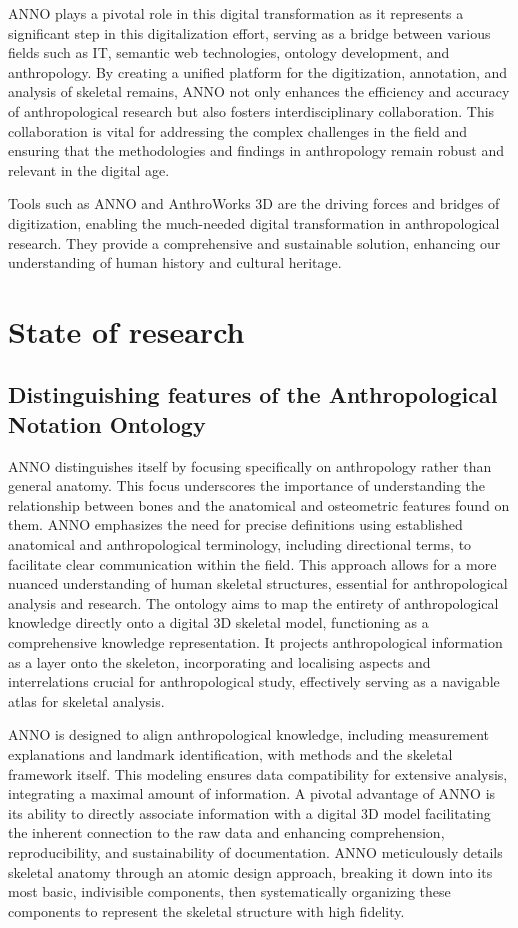 \documentclass[sw]{iosart2x}
\begin{document}
ANNO plays a pivotal role in this digital transformation as it represents a significant step in this digitalization effort, serving as a bridge between various fields such as IT, semantic web technologies, ontology development, and anthropology.
By creating a unified platform for the digitization, annotation, and analysis of skeletal remains, ANNO not only enhances the efficiency and accuracy of anthropological research but also fosters interdisciplinary collaboration.
This collaboration is vital for addressing the complex challenges in the field and ensuring that the methodologies and findings in anthropology remain robust and relevant in the digital age.

Tools such as ANNO and AnthroWorks 3D are the driving forces and bridges of digitization, enabling the much-needed digital transformation in anthropological research.
They provide a comprehensive and sustainable solution, enhancing our understanding of human history and cultural heritage.

\section{State of research}\label{sec:stateofresearch}

\subsection{Distinguishing features of the Anthropological Notation Ontology}\label{sec:distinguishingAnno}
ANNO distinguishes itself by focusing specifically on anthropology rather than general anatomy.
This focus underscores the importance of understanding the relationship between bones and the anatomical and osteometric features found on them.
ANNO emphasizes the need for precise definitions using established anatomical and anthropological terminology, including directional terms, to facilitate clear communication within the field.
This approach allows for a more nuanced understanding of human skeletal structures, essential for anthropological analysis and research.
The ontology aims to map the entirety of anthropological knowledge directly onto a digital 3D skeletal model, functioning as a comprehensive knowledge representation.
It projects anthropological information as a layer onto the skeleton, incorporating and localising aspects and interrelations crucial for anthropological study, effectively serving as a navigable atlas for skeletal analysis.

ANNO is designed to align anthropological knowledge, including measurement explanations and landmark identification, with methods and the skeletal framework itself.
This modeling ensures data compatibility for extensive analysis, integrating a maximal amount of information.
A pivotal advantage of ANNO is its ability to directly associate information with a digital 3D model facilitating the inherent connection to the raw data and enhancing comprehension, reproducibility, and sustainability of documentation.
ANNO meticulously details skeletal anatomy through an atomic design approach, breaking it down into its most basic, indivisible components, then systematically organizing these components to represent the skeletal structure with high fidelity.
\end{document}
